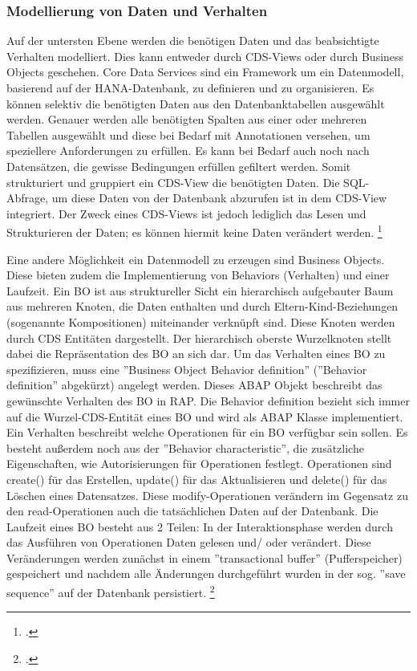 \subsubsection{Modellierung von Daten und Verhalten}

Auf der untersten Ebene werden die benötigen Daten und das beabsichtigte Verhalten modelliert. Dies kann entweder durch CDS-Views oder durch Business Objects geschehen. Core Data Services sind ein Framework um ein Datenmodell, basierend auf der HANA-Datenbank, zu definieren und zu organisieren. Es können selektiv die benötigten Daten aus den Datenbanktabellen ausgewählt werden. Genauer werden alle benötigten Spalten aus einer oder mehreren Tabellen ausgewählt und diese bei Bedarf mit Annotationen versehen, um speziellere Anforderungen zu erfüllen. Es kann bei Bedarf auch noch nach Datensätzen, die gewisse Bedingungen erfüllen gefiltert werden. Somit strukturiert und gruppiert ein CDS-View die benötigten Daten. Die SQL-Abfrage, um diese Daten von der Datenbank abzurufen ist in dem CDS-View integriert. Der Zweck eines CDS-Views ist jedoch lediglich das Lesen und Strukturieren der Daten; es können hiermit keine Daten verändert werden. \footcite[Vgl.][]{sap_rap_2023}

Eine andere Möglichkeit ein Datenmodell zu erzeugen sind Business Objects. Diese bieten zudem die Implementierung von Behaviors (Verhalten) und einer Laufzeit. Ein BO ist aus struktureller Sicht ein hierarchisch aufgebauter Baum aus mehreren Knoten, die Daten enthalten und durch Eltern-Kind-Beziehungen (sogenannte Kompositionen) miteinander verknüpft sind. Diese Knoten werden durch CDS Entitäten dargestellt. Der hierarchisch oberste Wurzelknoten stellt dabei die Repräsentation des BO an sich dar. Um das Verhalten eines BO zu spezifizieren, muss eine ''Business Object Behavior definition'' (''Behavior definition'' abgekürzt) angelegt werden. Dieses ABAP Objekt beschreibt das gewünschte Verhalten des BO in RAP. Die Behavior definition bezieht sich immer auf die Wurzel-CDS-Entität eines BO und wird als ABAP Klasse implementiert. Ein Verhalten beschreibt welche Operationen für ein BO verfügbar sein sollen. Es besteht au{\ss}erdem noch aus der ''Behavior characteristic'', die zusätzliche Eigenschaften, wie \zB Autorisierungen für Operationen festlegt. Operationen sind \zB create() für das Erstellen, update() für das Aktualisieren und delete() für das Löschen eines Datensatzes. Diese modify-Operationen verändern im Gegensatz zu den read-Operationen auch die tatsächlichen Daten auf der Datenbank. Die Laufzeit eines BO besteht aus 2 Teilen: In der Interaktionsphase werden durch das Ausführen von Operationen Daten gelesen und/ oder verändert. Diese Veränderungen werden zunächst in einem ''transactional buffer'' (Pufferspeicher) gespeichert und nachdem alle Änderungen durchgeführt wurden in der sog. ''save sequence'' auf der Datenbank persistiert. \footcite[Vgl.][]{sap_rap_2023}

